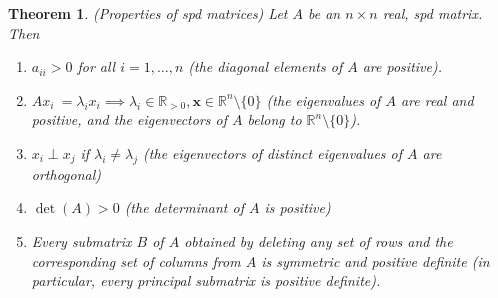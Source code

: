 \documentclass[12pt]{article}
\newtheorem{theorem}{Theorem}
\theoremstyle{definition}
\newcommand{\R}{\mathbb{R}}
\newcommand{\x}{\bm{x}}
\begin{document}
\begin{theorem}(Properties of spd matrices)
Let $A$ be an $n \times n$ real, spd matrix. Then
\begin{enumerate}
	\item $a_{ii} > 0$ for all $i=1, \ldots, n$ (the diagonal elements of $A$ are positive). 
	\item $A x_i \ = \lambda_i x_i \implies \lambda_i \in \R_{>0}, \x \in \R^n \setminus \{0\}$ (the eigenvalues of $A$ are real and positive, and the eigenvectors of $A$ belong to $\R^n \setminus \{0\}$).
	\item $x_i \perp x_j$ if $\lambda_i \neq \lambda_j$ (the eigenvectors of distinct eigenvalues of $A$ are orthogonal)
	\item $\det(A) > 0$ (the determinant of $A$ is positive)
	\item Every submatrix $B$ of $A$ obtained by deleting any set of rows and the corresponding set of columns from $A$ is symmetric and positive definite (in particular, every principal submatrix is positive definite). 
\end{enumerate}
\end{theorem}
\end{document}
